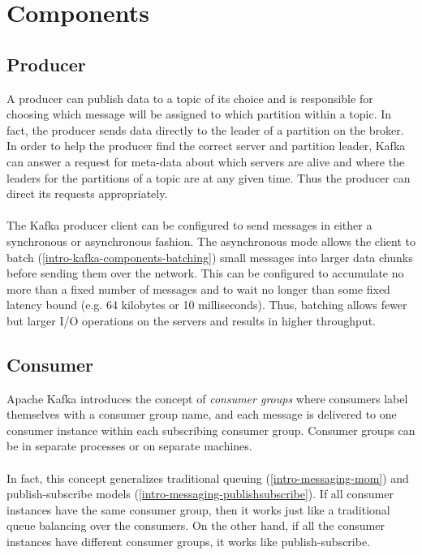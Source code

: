 \section{Components}

\subsection{Producer}

A producer can publish data to a topic of its choice and is responsible for
choosing which message will be assigned to which partition within a topic. In
fact, the producer sends data directly to the leader of a partition on the
broker. In order to help the producer find the correct server and partition
leader, Kafka can answer a request for meta-data about which servers are alive
and where the leaders for the partitions of a topic are at any given time. Thus
the producer can direct its requests appropriately. \cite{apachekafka}
\\ \\
The Kafka producer client can be configured to send messages in either a
synchronous or asynchronous fashion. The asynchronous mode allows the client to
batch (\ref{intro-kafka-components-batching}) small messages into larger data
chunks before sending them over the network. This can be configured to accumulate
no more than a fixed number of messages and to wait no longer than some fixed
latency bound (e.g. 64 kilobytes or 10 milliseconds). Thus, batching allows
fewer but larger I/O operations on the servers and results in higher throughput.
\cite{apachekafka} \cite{goodhope2012building}

\subsection{Consumer}
\label{subsec:kafka-consumer}

Apache Kafka introduces the concept of \textit{consumer groups} where consumers
label themselves with a consumer group name, and each message is delivered to
one consumer instance within each subscribing consumer group. Consumer groups
can be in separate processes or on separate machines.
\\ \\
In fact, this concept generalizes traditional queuing (\ref{intro-messaging-mom})
and publish-subscribe models (\ref{intro-messaging-publishsubscribe}).
If all consumer instances have the same consumer
group, then it works just like a traditional queue balancing over the consumers.
On the other hand, if all the consumer instances have different consumer groups,
it works like publish-subscribe.

